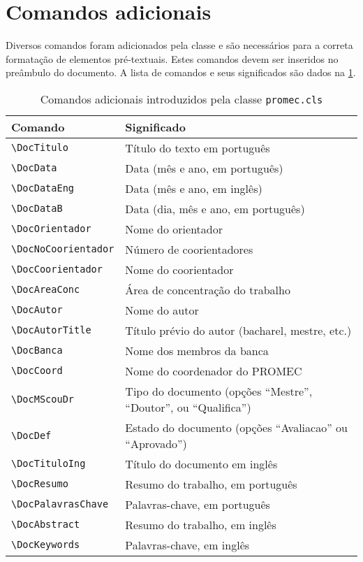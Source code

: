\section{Comandos adicionais}
Diversos comandos foram adicionados pela classe e são necessários para a correta formatação de elementos pré-textuais. Estes comandos devem ser inseridos no preâmbulo do documento. A lista de comandos e seus significados são dados na \cref{Tab:comandos-adicionais}.
\begin{table}[tb]
    \centering
    \caption{Comandos adicionais introduzidos pela classe \texttt{promec.cls}}
    \label{Tab:comandos-adicionais}
    \begin{tabular}{lp{8cm}}
        \toprule
        Comando & Significado \\
        \midrule
        \lstinline!\DocTitulo! & Título do texto em português \\
        \lstinline!\DocData! & Data (mês e ano, em português) \\
        \lstinline!\DocDataEng! & Data (mês e ano, em inglês) \\
        \lstinline!\DocDataB! & Data (dia, mês e ano, em português) \\
        \lstinline!\DocOrientador! & Nome do orientador \\
        \lstinline!\DocNoCoorientador! & Número de coorientadores \\
        \lstinline!\DocCoorientador! & Nome do coorientador \\
        \lstinline!\DocAreaConc! & Área de concentração do trabalho \\
        \lstinline!\DocAutor! & Nome do autor \\
        \lstinline!\DocAutorTitle! & Título prévio do autor (bacharel, mestre, etc.) \\
        \lstinline!\DocBanca! & Nome dos membros da banca \\
        \lstinline!\DocCoord! & Nome do coordenador do PROMEC \\
        \lstinline!\DocMScouDr! & Tipo do documento (opções ``Mestre'', ``Doutor'', ou ``Qualifica'') \\
        \lstinline!\DocDef!  & Estado do documento (opções ``Avaliacao'' ou ``Aprovado'') \\ 
        \lstinline!\DocTituloIng! & Título do documento em inglês \\
        \lstinline!\DocResumo! & Resumo do trabalho, em português \\
        \lstinline!\DocPalavrasChave! & Palavras-chave, em português \\
        \lstinline!\DocAbstract! & Resumo do trabalho, em inglês \\
        \lstinline!\DocKeywords! & Palavras-chave, em inglês \\
        \bottomrule
    \end{tabular}
\end{table}

